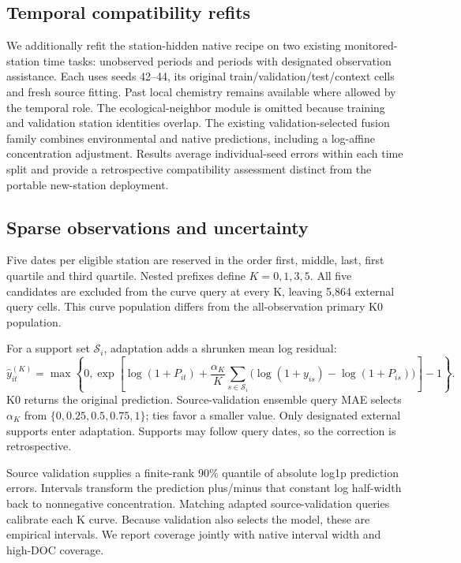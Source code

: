 \documentclass[11pt]{article}
\begin{document}
\subsection{Temporal compatibility refits}
We additionally refit the station-hidden native recipe on two existing monitored-station time tasks: unobserved periods and periods with designated observation assistance. Each uses seeds 42--44, its original train/validation/test/context cells and fresh source fitting. Past local chemistry remains available where allowed by the temporal role. The ecological-neighbor module is omitted because training and validation station identities overlap. The existing validation-selected fusion family combines environmental and native predictions, including a log-affine concentration adjustment. Results average individual-seed errors within each time split and provide a retrospective compatibility assessment distinct from the portable new-station deployment.

\subsection{Sparse observations and uncertainty}
Five dates per eligible station are reserved in the order first, middle, last, first quartile and third quartile. Nested prefixes define $K=0,1,3,5$. All five candidates are excluded from the curve query at every K, leaving 5,864 external query cells. This curve population differs from the all-observation primary K0 population.

For a support set $\mathcal S_i$, adaptation adds a shrunken mean log residual:
\[
 \widehat y_{it}^{(K)}
 =\max\!\left\{0,\exp\!\left[\log(1+P_{it})
 +\frac{\alpha_K}{K}\sum_{s\in\mathcal S_i}
       \bigl(\log(1+y_{is})-\log(1+P_{is})\bigr)\right]-1\right\}.
\]
K0 returns the original prediction. Source-validation ensemble query MAE selects $\alpha_K$ from $\{0,0.25,0.5,0.75,1\}$; ties favor a smaller value. Only designated external supports enter adaptation. Supports may follow query dates, so the correction is retrospective.

Source validation supplies a finite-rank 90\% quantile of absolute log1p prediction errors. Intervals transform the prediction plus/minus that constant log half-width back to nonnegative concentration. Matching adapted source-validation queries calibrate each K curve. Because validation also selects the model, these are empirical intervals. We report coverage jointly with native interval width and high-DOC coverage.
\end{document}
